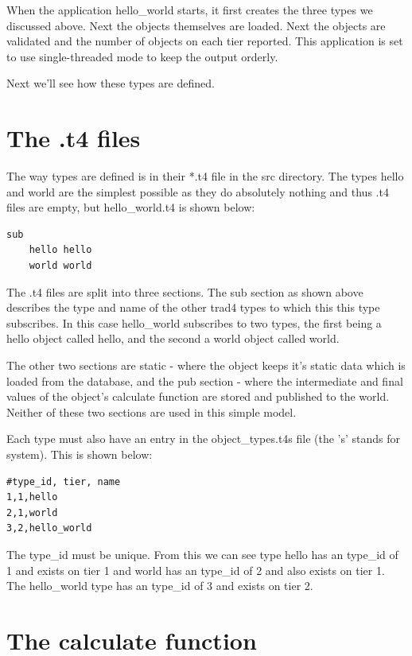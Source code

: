 \documentclass{report}
\begin{document}
When the application hello_world starts, it first creates the three types we discussed above. Next the objects themselves are loaded. Next the objects are validated and the number of objects on each tier reported. This application is set to use single-threaded mode to keep the output orderly. 

Next we'll see how these types are defined.

\section{The .t4 files}

The way types are defined is in their *.t4 file in the src directory. The types hello and world are the simplest possible as they do absolutely nothing and thus .t4 files are empty, but hello_world.t4 is shown below:

\begin{verbatim}
sub
    hello hello
    world world
\end{verbatim}

The .t4 files are split into three sections. The sub section as shown above describes the type and name of the other trad4 types to which this this type subscribes. In this case hello_world subscribes to two types, the first being a hello object called hello, and the second a world object called world.

The other two sections are static - where the object keeps it's static data which is loaded from the database, and the pub section - where the intermediate and final values of the object's calculate function are stored and published to the world. Neither of these two sections are used in this simple model.

Each type must also have an entry in the object_types.t4s file (the 's' stands for system). This is shown below:

\begin{verbatim}
#type_id, tier, name
1,1,hello
2,1,world
3,2,hello_world
\end{verbatim}


The type_id must be unique. From this we can see type hello has an type_id of 1 and exists on tier 1 and world has an type_id of 2 and also exists on tier 1. The hello_world type has an type_id of 3 and exists on tier 2.

\section{The calculate function}
\end{document}
